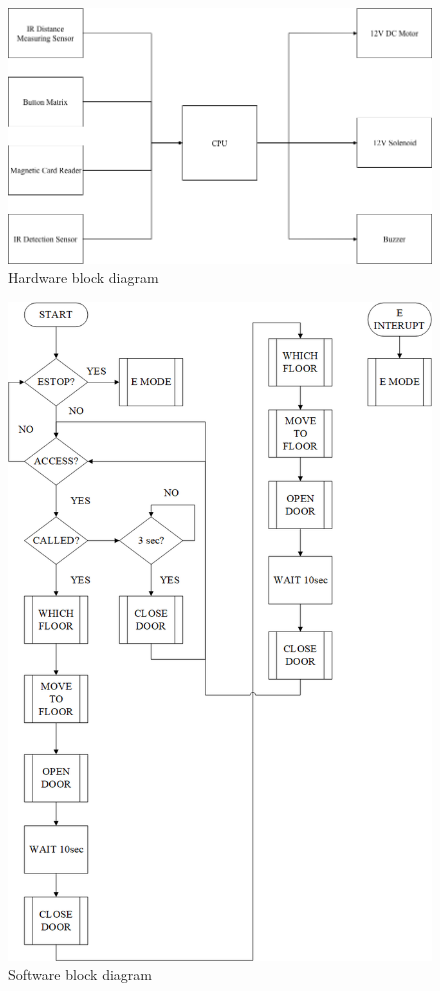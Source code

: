 \documentclass{article}
\begin{document}
	\begin{figure}[h!]
		\includegraphics[width=\linewidth]{hwbd.png}
		\caption{Hardware block diagram}
		\label{fig:hardware_block_diagram}
	\end{figure}
	\begin{figure}[h!]
		\includegraphics[width=\linewidth]{swbd.png}
		\caption{Software block diagram}
		\label{fig:software_block_diagram}
	\end{figure}
\end{document}
